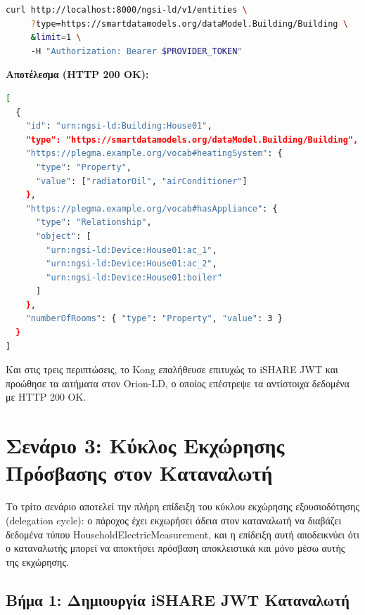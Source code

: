 \begin{lstlisting}[language=bash, caption={Building data read request.}, stringstyle=\color{black}, keywordstyle=\color{black}]
curl http://localhost:8000/ngsi-ld/v1/entities \
     ?type=https://smartdatamodels.org/dataModel.Building/Building \
     &limit=1 \
     -H "Authorization: Bearer $PROVIDER_TOKEN"
\end{lstlisting}
\noindent \textbf{Αποτέλεσμα (\textlatin{HTTP 200 OK}):}
\begin{lstlisting}[language=bash, caption={Response with building metadata.}, stringstyle=\color{black}, keywordstyle=\color{black}]
[
  {
    "id": "urn:ngsi-ld:Building:House01",
    "type": "https://smartdatamodels.org/dataModel.Building/Building",
    "https://plegma.example.org/vocab#heatingSystem": {
      "type": "Property",
      "value": ["radiatorOil", "airConditioner"]
    },
    "https://plegma.example.org/vocab#hasAppliance": {
      "type": "Relationship",
      "object": [
        "urn:ngsi-ld:Device:House01:ac_1",
        "urn:ngsi-ld:Device:House01:ac_2",
        "urn:ngsi-ld:Device:House01:boiler"
      ]
    },
    "numberOfRooms": { "type": "Property", "value": 3 }
  }
]
\end{lstlisting}
Και στις τρεις περιπτώσεις, το \textlatin{Kong} επαλήθευσε επιτυχώς το
\textlatin{iSHARE JWT} και προώθησε τα αιτήματα στον \textlatin{Orion-LD},
ο οποίος επέστρεψε τα αντίστοιχα δεδομένα με \textlatin{HTTP 200 OK}.

\section{Σενάριο 3: Κύκλος Εκχώρησης Πρόσβασης στον Καταναλωτή}
\label{sec:scenario3}

Το τρίτο σενάριο αποτελεί την πλήρη επίδειξη του κύκλου εκχώρησης
εξουσιοδότησης (\textlatin{delegation cycle}): ο πάροχος έχει εκχωρήσει άδεια
στον καταναλωτή να διαβάζει δεδομένα τύπου \textlatin{HouseholdElectricMeasurement},
και η επίδειξη αυτή αποδεικνύει ότι ο καταναλωτής μπορεί να αποκτήσει
πρόσβαση αποκλειστικά και μόνο μέσω αυτής της εκχώρησης.

\subsection{Βήμα 1: Δημιουργία \textlatin{iSHARE JWT} Καταναλωτή}
\label{subsec:scenario3-consumer-jwt}

